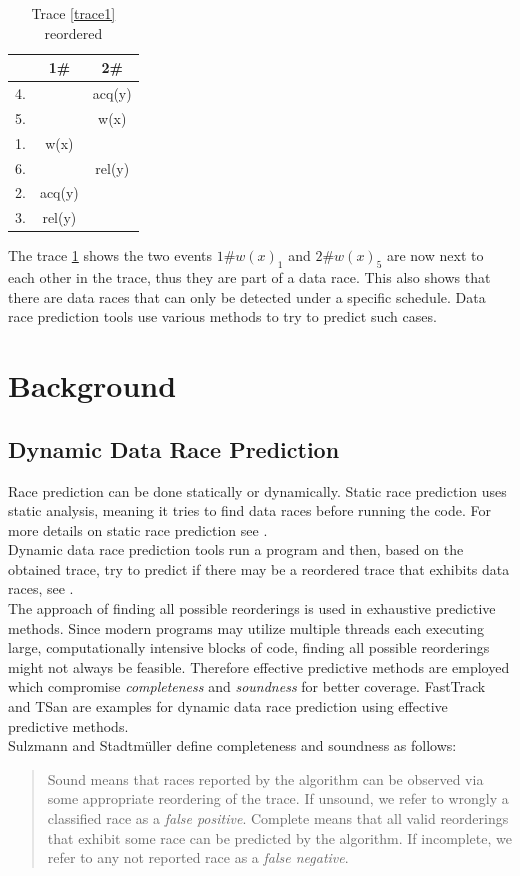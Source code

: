 \documentclass[12pt]{article}
\begin{document}
	\begin{table}[H]
		\begin{center}
			\begin{tabular}{ c c c}
				& 1\# & 2\# \\
				\hline
				4. & & acq(y) \\
				5. & & w(x) \\
				1. & w(x) & \\
				6. &  & rel(y) \\
				2. & acq(y) & \\
				3. & rel(y) & \\
			\end{tabular}
			\caption{Trace \ref{trace1} reordered}
			\label{trace2}
		\end{center}
	\end{table}
	The trace \ref{trace2} shows the two events $1\#w(x)_1$ and $2\#w(x)_5$ are now next to each other in the trace, thus they are part of a data race. This also shows that there are data races that can only be detected under a specific schedule. Data race prediction tools use various methods to try to predict such cases.
	\section{Background}\label{background-sec}
		\subsection{Dynamic Data Race Prediction}
		Race prediction can be done statically or dynamically. Static race prediction uses static analysis, meaning it tries to find data races before running the code. For more details on static race prediction see \cite{naik}.\\
		Dynamic data race prediction tools run a program and then, based on the obtained trace, try to predict if there may be a reordered trace that exhibits data races, see \cite[p. 2]{sulzmann2}.\\
		The approach of finding all possible reorderings is used in exhaustive predictive methods. Since modern programs may utilize multiple threads each executing large, computationally intensive blocks of code, finding all possible reorderings might not always be feasible. Therefore effective predictive methods are employed which compromise \textit{completeness} and \textit{soundness} for better coverage. FastTrack and TSan are examples for dynamic data race prediction using effective predictive methods.\\
		Sulzmann and Stadtm\"uller \cite[p. 2]{sulzmann} define completeness and soundness as follows:
		\begin{quote}
			Sound means that races reported by the algorithm can be observed via some appropriate reordering of the trace. If unsound, we refer to wrongly a classiﬁed race as a \textit{false positive}. Complete means that all valid reorderings that exhibit some race can be predicted by the algorithm. If incomplete, we refer to any not reported race as a \textit{false negative}.
		\end{quote}
\end{document}
